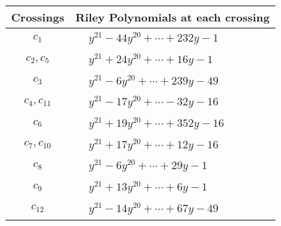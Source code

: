 \documentclass[1p]{elsarticle_modified}
\theoremstyle{definition}
\begin{document}
\begin{tabular}{m{50pt}|m{274pt}}
Crossings & \hspace{64pt}Riley Polynomials at each crossing \\
\hline $$\begin{aligned}c_{1}\end{aligned}$$&$\begin{aligned}
&y^{21}-44 y^{20}+\cdots+232 y-1
\end{aligned}$\\
\hline $$\begin{aligned}c_{2},c_{5}\end{aligned}$$&$\begin{aligned}
&y^{21}+24 y^{20}+\cdots+16 y-1
\end{aligned}$\\
\hline $$\begin{aligned}c_{3}\end{aligned}$$&$\begin{aligned}
&y^{21}-6 y^{20}+\cdots+239 y-49
\end{aligned}$\\
\hline $$\begin{aligned}c_{4},c_{11}\end{aligned}$$&$\begin{aligned}
&y^{21}-17 y^{20}+\cdots-32 y-16
\end{aligned}$\\
\hline $$\begin{aligned}c_{6}\end{aligned}$$&$\begin{aligned}
&y^{21}+19 y^{20}+\cdots+352 y-16
\end{aligned}$\\
\hline $$\begin{aligned}c_{7},c_{10}\end{aligned}$$&$\begin{aligned}
&y^{21}+17 y^{20}+\cdots+12 y-16
\end{aligned}$\\
\hline $$\begin{aligned}c_{8}\end{aligned}$$&$\begin{aligned}
&y^{21}-6 y^{20}+\cdots+29 y-1
\end{aligned}$\\
\hline $$\begin{aligned}c_{9}\end{aligned}$$&$\begin{aligned}
&y^{21}+13 y^{20}+\cdots+6 y-1
\end{aligned}$\\
\hline $$\begin{aligned}c_{12}\end{aligned}$$&$\begin{aligned}
&y^{21}-14 y^{20}+\cdots+67 y-49
\end{aligned}$\\
\hline
\end{tabular}\\~\\
\end{document}

